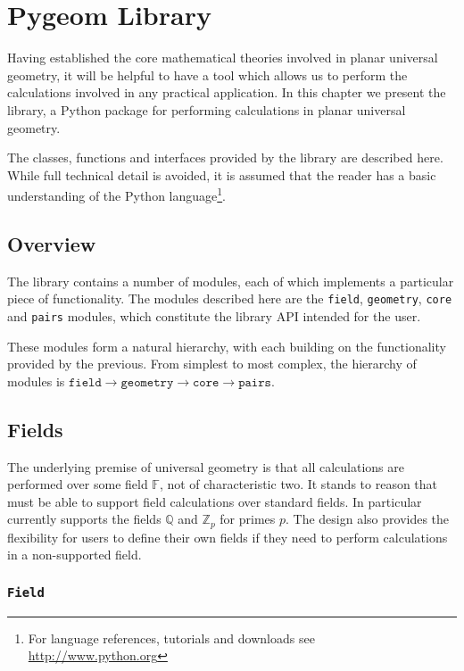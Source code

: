 \chapter{Pygeom Library}\label{chap:pygeom}

Having established the core mathematical theories involved in planar universal geometry, it will be helpful to have a tool which allows us to perform the calculations involved in any practical application.
In this chapter we present the \pygeom library, a Python package for performing calculations in planar universal geometry.

The classes, functions and interfaces provided by the library are described here.
While full technical detail is avoided, it is assumed that the reader has a basic understanding of the Python language\footnote{For language references, tutorials and downloads see \url{http://www.python.org}}.

\section{Overview}

The \pygeom library contains a number of modules, each of which implements a particular piece of functionality.
The modules described here are the \texttt{field}, \texttt{geometry}, \texttt{core} and \texttt{pairs} modules, which constitute the library API intended for the user.

These modules form a natural hierarchy, with each building on the functionality provided by the previous.
From simplest to most complex, the hierarchy of modules is $\texttt{field} \to \texttt{geometry} \to \texttt{core} \to \texttt{pairs}$.

\section{Fields}

The underlying premise of universal geometry is that all calculations are performed over some field $\mathbb{F}$, not of characteristic two.
It stands to reason that \pygeom must be able to support field calculations over standard fields.
In particular \pygeom currently supports the fields $\mathbb{Q}$ and $\mathbb{Z}_p$ for primes $p$.
The design also provides the flexibility for users to define their own fields if they need to perform calculations in a non-supported field.

\subsection{\texttt{Field}}

